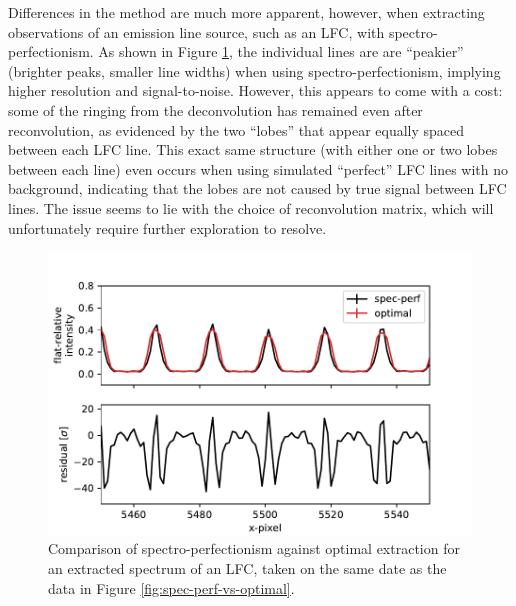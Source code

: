Differences in the method are much more apparent, however, when extracting observations of an emission line source, such as an LFC, with spectro-perfectionism. As shown in Figure \ref{fig:spec-perf-vs-optimal-lfc}, the individual lines are are ``peakier'' (brighter peaks, smaller line widths) when using spectro-perfectionism, implying higher resolution and signal-to-noise. However, this appears to come with a cost: some of the ringing from the deconvolution has remained even after reconvolution, as evidenced by the two ``lobes'' that appear equally spaced between each LFC line. This exact same structure (with either one or two lobes between each line) even occurs when using simulated ``perfect'' LFC lines with no background, indicating that the lobes are not caused by true signal between LFC lines. The issue seems to lie with the choice of reconvolution matrix, which will unfortunately require further exploration to resolve.

\begin{figure}
    \centering
    \includegraphics{figures-5/spec-perf-vs-optimal-lfc.pdf}
    \caption[Spectro-perfectionism vs. optimal extraction -- Laser frequency comb spectrum]{Comparison of spectro-perfectionism against optimal extraction for an extracted spectrum of an LFC, taken on the same date as the data in Figure \ref{fig:spec-perf-vs-optimal}.}
    \label{fig:spec-perf-vs-optimal-lfc}
\end{figure}

